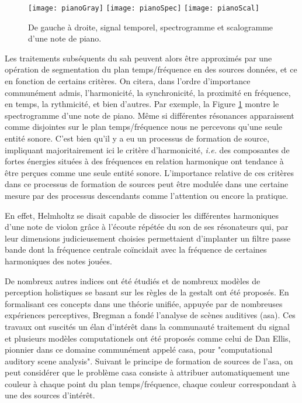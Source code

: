 \begin{figure}[t]
  \texttt{[image: pianoGray]}
  \texttt{[image: pianoSpec]}
  \texttt{[image: pianoScal]}
  \caption{De gauche à droite, signal temporel, spectrogramme et scalogramme d'une note de piano.}
  \label{fig:piano}
\end{figure}

Les traitements subséquents du sah peuvent alors être approximés par une opération de segmentation du plan temps/fréquence en des sources données, et ce en fonction de certains critères.  On citera, dans l'ordre d'importance communément admis, l'harmonicité, la synchronicité, la proximité en fréquence, en temps, la rythmicité, et bien d'autres. Par exemple, la Figure \ref{fig:piano} montre le spectrogramme d'une note de piano. Même si différentes résonances apparaissent comme disjointes sur le plan temps/fréquence nous ne percevons qu'une seule entité sonore. C'est bien qu'il y a eu un processus de formation de source, impliquant majoritairement ici le critère d'harmonicité, \textit{i.e.} des composantes de fortes énergies situées à des fréquences en relation harmonique ont tendance à être perçues comme une seule entité sonore. L'importance relative de ces critères dans ce processus de formation de sources peut être modulée dans une certaine mesure par des processus descendants comme l'attention ou encore la pratique.

En effet, Helmholtz se disait capable de dissocier les différentes harmoniques d'une note de violon grâce à l'écoute répétée du son de ses résonateurs qui, par leur dimensions judicieusement choisies permettaient d'implanter un filtre passe bande dont la fréquence centrale coïncidait avec la fréquence de certaines harmoniques des notes jouées.

De nombreux autres indices ont été étudiés et de nombreux modèles de perception holistiques se basant sur les règles de la gestalt\cite{koffka2013principles} ont été proposés. En formalisant ces concepts dans une théorie unifiée, appuyée par de nombreuses expériences perceptives, Bregman a fondé l'analyse de scènes auditives (asa)\cite{bregman1994auditory}. Ces travaux ont suscités un élan d'intérêt dans la communauté traitement du signal et plusieurs modèles computationels ont été proposés comme celui de Dan Ellis\cite{ellis1996prediction}, pionnier dans ce domaine communément appelé casa, pour "computational auditory scene analysis". Suivant le principe de formation de sources de l'asa, on peut considérer que le problème casa consiste à attribuer automatiquement une couleur à chaque point du plan temps/fréquence, chaque couleur correspondant à une des sources d'intérêt.


